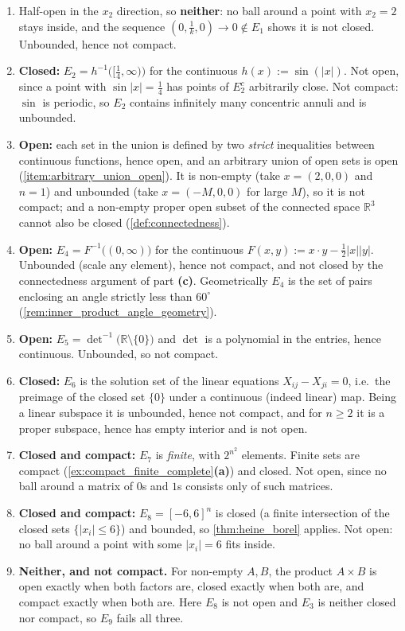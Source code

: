 \begin{exercisesolution}
\begin{enumerate}[label=\textbf{(\alph*)}]
  \item Half-open in the $x_2$ direction, so \textbf{neither}: no ball around a point with
    $x_2 = 2$ stays inside, and the sequence $(0,\tfrac1k,0) \to 0 \notin E_1$ shows it is not
    closed. Unbounded, hence not compact.
  \item \textbf{Closed:} $E_2 = h^{-1}\big([\tfrac14,\infty)\big)$ for the continuous
    $h(x) := \sin(|x|)$. Not open, since a point with $\sin|x| = \tfrac14$
    has points of $E_2^c$ arbitrarily close. Not compact: $\sin$ is periodic, so $E_2$ contains
    infinitely many concentric annuli and is unbounded.
  \item \textbf{Open:} each set in the union is defined by two \emph{strict} inequalities between
    continuous functions, hence open, and an arbitrary union of open sets is open
    (\cref{item:arbitrary_union_open}). It is non-empty (take $x = (2,0,0)$ and $n=1$) and
    unbounded (take $x = (-M,0,0)$ for large $M$), so it is not compact; and a non-empty proper
    open subset of the connected space $\mathbb{R}^3$ cannot also be closed
    (\cref{def:connectedness}).
  \item \textbf{Open:} $E_4 = F^{-1}\big((0,\infty)\big)$ for the continuous
    $F(x,y) := x\cdot y - \tfrac12|x||y|$. Unbounded (scale any element),
    hence not compact, and not closed by the connectedness argument of part \textbf{(c)}.
    Geometrically $E_4$ is the set of pairs enclosing an angle strictly less than $60^\circ$
    (\cref{rem:inner_product_angle_geometry}).
  \item \textbf{Open:} $E_5 = \det^{-1}\big(\mathbb{R}\setminus\{0\}\big)$ and $\det$ is a
    polynomial in the entries, hence continuous. Unbounded, so not compact.
  \item \textbf{Closed:} $E_6$ is the solution set of the linear equations $X_{ij} - X_{ji} = 0$,
    i.e.\ the preimage of the closed set $\{0\}$ under a continuous (indeed linear) map. Being a
    linear subspace it is unbounded, hence not compact, and for $n \geq 2$ it is a proper
    subspace, hence has empty interior and is not open.
  \item \textbf{Closed and compact:} $E_7$ is \emph{finite}, with $2^{n^2}$ elements. Finite sets
    are compact (\cref{ex:compact_finite_complete}\textbf{(a)}) and closed. Not open, since no
    ball around a matrix of $0$s and $1$s consists only of such matrices.
  \item \textbf{Closed and compact:} $E_8 = [-6,6]^n$ is closed (a finite intersection of the
    closed sets $\{|x_i| \leq 6\}$) and bounded, so \cref{thm:heine_borel} applies. Not open:
    no ball around a point with some $|x_i| = 6$ fits inside.
  \item \textbf{Neither, and not compact.} For non-empty $A, B$, the product $A \times B$ is open
    exactly when both factors are, closed exactly when both are, and compact exactly when both
    are. Here $E_8$ is not open and $E_3$ is neither closed nor compact, so $E_9$ fails all
    three.


\end{enumerate}
\end{exercisesolution}
